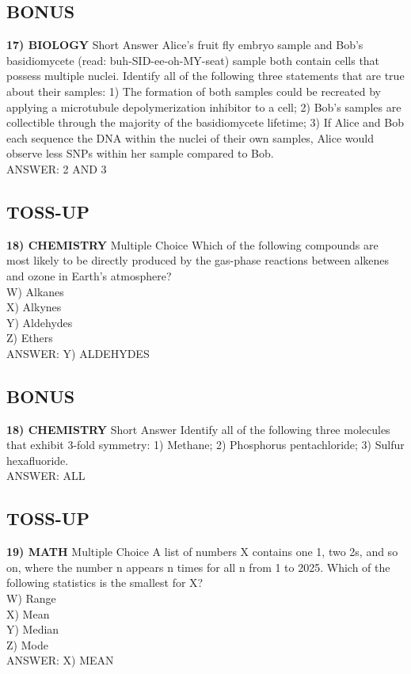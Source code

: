 \documentclass{article}
\begin{document}
\subsection*{BONUS}
\textbf{17) BIOLOGY} Short Answer Alice's fruit fly embryo sample and Bob's basidiomycete (read: buh-SID-ee-oh-MY-seat) sample both contain cells that possess multiple nuclei. Identify all of the following three statements that are true about their samples: 1) The formation of both samples could be recreated by applying a microtubule depolymerization inhibitor to a cell; 2) Bob's samples are collectible through the majority of the basidiomycete lifetime; 3) If Alice and Bob each sequence the DNA within the nuclei of their own samples, Alice would observe less SNPs within her sample compared to Bob.
\\ANSWER: 2 AND 3

\subsection*{TOSS-UP}
\textbf{18) CHEMISTRY} Multiple Choice Which of the following compounds are most likely to be directly produced by the gas-phase reactions between alkenes and ozone in Earth's atmosphere?
\\W) Alkanes
\\X) Alkynes
\\Y) Aldehydes
\\Z) Ethers
\\ANSWER: Y) ALDEHYDES

\subsection*{BONUS}
\textbf{18) CHEMISTRY} Short Answer Identify all of the following three molecules that exhibit 3-fold symmetry: 1) Methane; 2) Phosphorus pentachloride; 3) Sulfur hexafluoride.
\\ANSWER: ALL

\subsection*{TOSS-UP}
\textbf{19) MATH} Multiple Choice A list of numbers X contains one 1, two 2s, and so on, where the number n appears n times for all n from 1 to 2025. Which of the following statistics is the smallest for X?
\\W) Range
\\X) Mean
\\Y) Median
\\Z) Mode
\\ANSWER: X) MEAN
\end{document}
